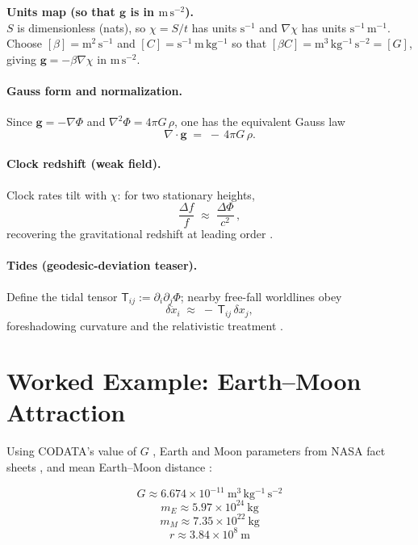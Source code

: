 \begin{tcolorbox}
\textbf{Units map (so that $\mathbf g$ is in $\mathrm{m\,s^{-2}}$).}\\
$S$ is dimensionless (nats), so $\chi=S/t$ has units $\mathrm{s^{-1}}$ and $\nabla\chi$ has units $\mathrm{s^{-1}\,m^{-1}}$.\\
Choose $[\beta]=\mathrm{m^2\,s^{-1}}$ and $[C]=\mathrm{s^{-1}\,m\,kg^{-1}}$ so that
$[\beta C]=\mathrm{m^3\,kg^{-1}\,s^{-2}}=[G]$, giving $\mathbf g=-\beta\nabla\chi$ in $\mathrm{m\,s^{-2}}$.
\end{tcolorbox}

\paragraph{Gauss form and normalization.}
Since $\mathbf g=-\nabla\Phi$ and $\nabla^2\Phi=4\pi G\,\rho$, one has the equivalent Gauss law
\[
\nabla\!\cdot\!\mathbf g \;=\; -\,4\pi G\,\rho.
\]

\paragraph{Clock redshift (weak field).}
Clock rates tilt with $\chi$: for two stationary heights,
\[
\frac{\Delta f}{f} \;\approx\; \frac{\Delta \Phi}{c^2}\,,
\]
recovering the gravitational redshift at leading order \cite{einstein1916foundation,will2014confrontation}.

\paragraph{Tides (geodesic-deviation teaser).}
Define the tidal tensor $\mathsf{T}_{ij}:=\partial_i\partial_j\Phi$; nearby free-fall worldlines obey
\[
\delta\ddot{x}_i \;\approx\; -\,\mathsf{T}_{ij}\,\delta x_j,
\]
foreshadowing curvature and the relativistic treatment \cite{einstein1916foundation}.

\clearpage
\section*{Worked Example: Earth--Moon Attraction}
Using CODATA’s value of $G$ \cite{codata2018}, Earth and Moon parameters from NASA fact sheets
\cite{nasa_earth_fact,nasa_moon_fact}, and mean Earth–Moon distance \cite{nasa_moon_fact}:

\[
G \approx 6.674\times 10^{-11}\ \mathrm{m^3\,kg^{-1}\,s^{-2}}
\]
\[
m_E\approx 5.97\times 10^{24}\ \mathrm{kg}
\]
\[
m_M\approx 7.35\times 10^{22}\ \mathrm{kg}
\]
\[
r\approx 3.84\times 10^{8}\ \mathrm{m}
\]

